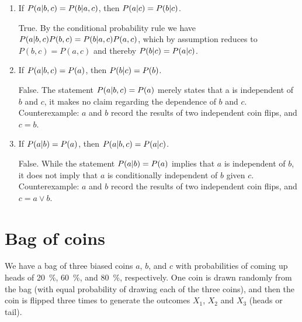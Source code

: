 \documentclass[11pt, a4paper]{article}
\begin{document}
\begin{enumerate}
    \item If $P(a \vert b, c) = P(b \vert a, c)$, then $P(a \vert c) = P(b \vert c)$.
    
    \begin{solution}
        True. By the conditional probability rule we have $P(a \vert b, c) P(b, c) = P(b \vert a, c) P(a, c)$, which by assumption reduces to $P(b, c) = P(a, c)$ and thereby $P(b \vert c) = P(a \vert c)$.
    \end{solution}
    
    \item If $P(a \vert b, c) = P(a)$, then $P(b \vert c) = P(b)$.
    
    \begin{solution}
        False. The statement $P(a \vert b, c) = P(a)$ merely states that a is independent of $b$ and $c$, it makes no claim regarding the dependence of $b$ and $c$. Counterexample: $a$ and $b$ record the results of two independent coin flips, and $c = b$.
    \end{solution}
    
    \item If $P(a \vert b) = P(a)$, then $P(a \vert b, c) = P(a \vert c)$.
    
    \begin{solution}
        False. While the statement $P(a \vert b) = P(a)$ implies that $a$ is independent of $b$, it does not imply that $a$ is conditionally independent of $b$ given $c$. Counterexample: $a$ and $b$ record the results of two independent coin flips, and $c = a \vee b$.
    \end{solution}
\end{enumerate}

\newpage

\section{Bag of coins}

We have a bag of three biased coins $a$, $b$, and $c$ with probabilities of coming up heads of \SI{20}{\percent}, \SI{60}{\percent}, and \SI{80}{\percent}, respectively. One coin is drawn randomly from the bag (with equal probability of drawing each of the three coins), and then the coin is flipped three times to generate the outcomes $X_1$, $X_2$ and $X_3$ (heads or tail).
\end{document}
